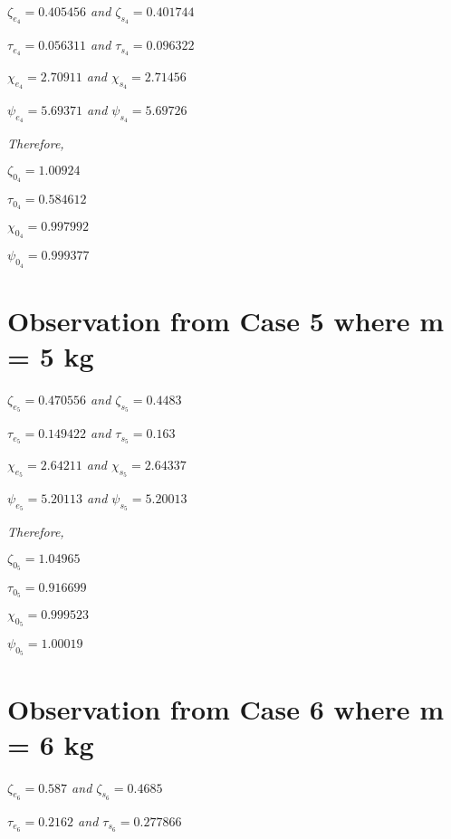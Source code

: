     \textit{$\zeta_{e_4} = 0.405456$ and $\zeta_{s_4} = 0.401744$}
            
    \textit{$\tau_{e_4} = 0.056311$ and $\tau_{s_4} = 0.096322$}
            
    \textit{$\chi_{e_4} = 2.70911$ and $\chi_{s_4} = 2.71456$}
            
    \textit{$\psi_{e_4} = 5.69371$ and $\psi_{s_4} = 5.69726$}
            
    \textit{Therefore,}
            
    $\zeta_{0_4} = 1.00924$
            
    $\tau_{0_4} = 0.584612$
            
    $\chi_{0_4} = 0.997992$
            
    $\psi_{0_4} = 0.999377$    
            
        
        
\section{{Observation from Case 5 where m = 5 kg}}
        
    \textit{$\zeta_{e_5} = 0.470556$ and $\zeta_{s_5} = 0.4483$}
            
    \textit{$\tau_{e_5} = 0.149422$ and $\tau_{s_5} = 0.163$}
            
    \textit{$\chi_{e_5} = 2.64211$ and $\chi_{s_5} = 2.64337$}
            
    \textit{$\psi_{e_5} = 5.20113$ and $\psi_{s_5} = 5.20013$}
                
    \textit{Therefore,}
            
    $\zeta_{0_5} = 1.04965$
            
    $\tau_{0_5} = 0.916699$
            
    $\chi_{0_5} = 0.999523$
            
    $\psi_{0_5} = 1.00019$    
            
        
        
\section{{Observation from Case 6 where m = 6 kg}}
        
    \textit{$\zeta_{e_6} = 0.587$ and $\zeta_{s_6} = 0.4685$}
            
    \textit{$\tau_{e_6} = 0.2162$ and $\tau_{s_6} = 0.277866$}
            
